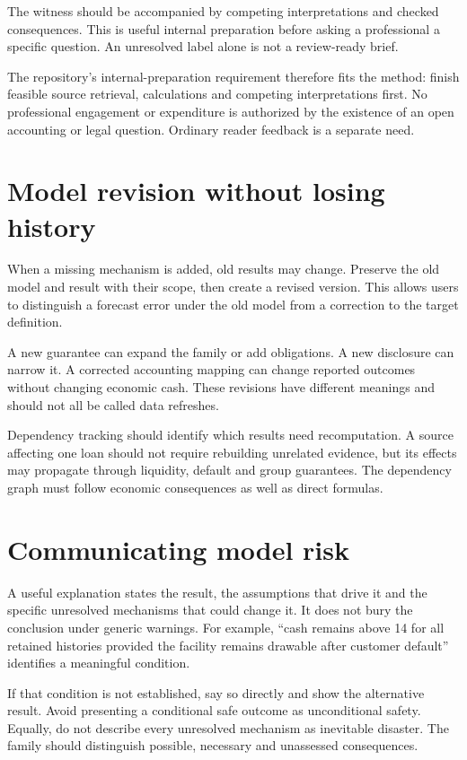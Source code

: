 The witness should be accompanied by competing interpretations and checked consequences. This is useful internal preparation before asking a professional a specific question. An unresolved label alone is not a review-ready brief.

The repository's internal-preparation requirement therefore fits the method: finish feasible source retrieval, calculations and competing interpretations first. No professional engagement or expenditure is authorized by the existence of an open accounting or legal question. Ordinary reader feedback is a separate need.

\section{Model revision without losing history}
When a missing mechanism is added, old results may change. Preserve the old model and result with their scope, then create a revised version. This allows users to distinguish a forecast error under the old model from a correction to the target definition.

A new guarantee can expand the family or add obligations. A new disclosure can narrow it. A corrected accounting mapping can change reported outcomes without changing economic cash. These revisions have different meanings and should not all be called data refreshes.

Dependency tracking should identify which results need recomputation. A source affecting one loan should not require rebuilding unrelated evidence, but its effects may propagate through liquidity, default and group guarantees. The dependency graph must follow economic consequences as well as direct formulas.

\section{Communicating model risk}
A useful explanation states the result, the assumptions that drive it and the specific unresolved mechanisms that could change it. It does not bury the conclusion under generic warnings. For example, ``cash remains above 14 for all retained histories provided the facility remains drawable after customer default'' identifies a meaningful condition.

If that condition is not established, say so directly and show the alternative result. Avoid presenting a conditional safe outcome as unconditional safety. Equally, do not describe every unresolved mechanism as inevitable disaster. The family should distinguish possible, necessary and unassessed consequences.

